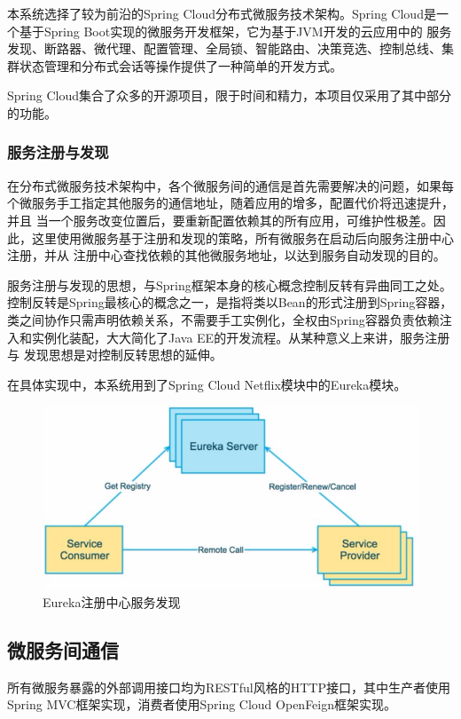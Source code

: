 \documentclass[titlepage,UTF8,linespread=1.5]{ctexart}
\begin{document}
本系统选择了较为前沿的Spring Cloud分布式微服务技术架构。Spring Cloud是一个基于Spring Boot实现的微服务开发框架，它为基于JVM开发的云应用中的
服务发现、断路器、微代理、配置管理、全局锁、智能路由、决策竞选、控制总线、集群状态管理和分布式会话等操作提供了一种简单的开发方式。\par
Spring Cloud集合了众多的开源项目，限于时间和精力，本项目仅采用了其中部分的功能。\par
\subsubsection{服务注册与发现}
在分布式微服务技术架构中，各个微服务间的通信是首先需要解决的问题，如果每个微服务手工指定其他服务的通信地址，随着应用的增多，配置代价将迅速提升，并且
当一个服务改变位置后，要重新配置依赖其的所有应用，可维护性极差。因此，这里使用微服务基于注册和发现的策略，所有微服务在启动后向服务注册中心注册，并从
注册中心查找依赖的其他微服务地址，以达到服务自动发现的目的。\par
服务注册与发现的思想，与Spring框架本身的核心概念控制反转有异曲同工之处。控制反转是Spring最核心的概念之一，是指将类以Bean的形式注册到Spring容器，
类之间协作只需声明依赖关系，不需要手工实例化，全权由Spring容器负责依赖注入和实例化装配，大大简化了Java EE的开发流程。从某种意义上来讲，服务注册与
发现思想是对控制反转思想的延伸。\par
在具体实现中，本系统用到了Spring Cloud Netflix模块中的Eureka模块。\par
\begin{figure}[H]
    \centering
    \includegraphics[width=130mm]{struct-eureka.png}
    \caption{Eureka注册中心服务发现}
    \label{fig:struct-eureka}
\end{figure}

\subsection{微服务间通信}
所有微服务暴露的外部调用接口均为RESTful风格的HTTP接口，其中生产者使用Spring MVC框架实现，消费者使用Spring Cloud OpenFeign框架实现。\par
\end{document}
